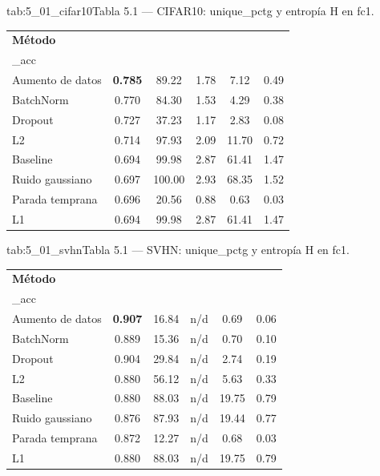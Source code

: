 \begin{table}{tab:5_01_cifar10}{Tabla 5.1 — CIFAR10: unique\_pctg y entropía H en fc1.}
\small
\begin{tabular}{lccccc}
\toprule
\textbf{Método} & \textbf{val\\_acc} & \textbf{uniq 30 (\\%
\midrule
Aumento de datos & \textbf{0.785} & 89.22 & 1.78 & 7.12 & 0.49 \\
BatchNorm & 0.770 & 84.30 & 1.53 & 4.29 & 0.38 \\
Dropout & 0.727 & 37.23 & 1.17 & 2.83 & 0.08 \\
L2 & 0.714 & 97.93 & 2.09 & 11.70 & 0.72 \\
Baseline & 0.694 & 99.98 & 2.87 & 61.41 & 1.47 \\
Ruido gaussiano & 0.697 & 100.00 & 2.93 & 68.35 & 1.52 \\
Parada temprana & 0.696 & 20.56 & 0.88 & 0.63 & 0.03 \\
L1 & 0.694 & 99.98 & 2.87 & 61.41 & 1.47 \\
\bottomrule
\end{tabular}
\end{table}

\begin{table}{tab:5_01_svhn}{Tabla 5.1 — SVHN: unique\_pctg y entropía H en fc1.}
\small
\begin{tabular}{lccccc}
\toprule
\textbf{Método} & \textbf{val\\_acc} & \textbf{uniq 30 (\\%
\midrule
Aumento de datos & \textbf{0.907} & 16.84 & n/d & 0.69 & 0.06 \\
BatchNorm & 0.889 & 15.36 & n/d & 0.70 & 0.10 \\
Dropout & 0.904 & 29.84 & n/d & 2.74 & 0.19 \\
L2 & 0.880 & 56.12 & n/d & 5.63 & 0.33 \\
Baseline & 0.880 & 88.03 & n/d & 19.75 & 0.79 \\
Ruido gaussiano & 0.876 & 87.93 & n/d & 19.44 & 0.77 \\
Parada temprana & 0.872 & 12.27 & n/d & 0.68 & 0.03 \\
L1 & 0.880 & 88.03 & n/d & 19.75 & 0.79 \\
\bottomrule
\end{tabular}
\end{table}

